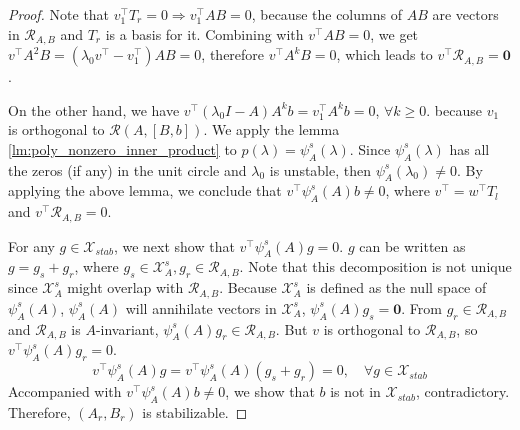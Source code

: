 \begin{proof}
Note that \(v_1^\top T_r = 0 \Rightarrow v_1^\top A B =0\), because the columns of $AB$ are vectors in \({\mathcal R}_{A,B}\) and $T_r$ is a basis for it. Combining with \(v^\top AB =0 \), we get \(v^\top A^2 B = (\lambda_0 v^\top-v_1^\top)AB=0\), therefore \(v^\top A^k B = 0\), which leads to \(v^\top \mathcal{R}_{A,B} = \mathbf{0}\).
 
On the other hand, we have \(v^\top (\lambda_0 I -A) A^{k} b =v_1^\top A^kb =0\), \(\forall k \geq 0\). because $v_1$ is orthogonal to ${\mathcal R}(A,[B,b])$.
We apply the lemma \ref{lm:poly_nonzero_inner_product} to $p
(\lambda)=\psi_A^s(\lambda)$.
Since \(\psi_A^s(\lambda)\) has all the zeros (if any) in the unit circle and \(\lambda_0\) is unstable, then \(\psi_A^s(\lambda_0) \neq 0\). By applying the above lemma, we conclude that \(v^\top \psi_A^s(A) b \neq 0\),  where $v^\top=w^\top T_l$ and $v^\top {\mathcal R}_{A,B}=0$.

For any \(g \in \mathcal{X}_{stab}\), we next show that \(v^\top \psi_A^s(A) g = 0\). \(g\) can be written as \(g = g_s + g_r\), where \(g_s \in \mathcal{X}_A^s, g_r \in \mathcal{R}_{A,B}\). Note that this decomposition is not unique since \(\mathcal{X}_A^s\) might overlap with \(\mathcal{R}_{A,B}\). Because \(\mathcal{X}_A^s\) is defined as the null space of \(\psi_A^s(A)\), \(\psi_A^s(A)\) will annihilate vectors in \(\mathcal{X}_A^s\), \(\psi_A^s(A) g_s =\mathbf{0}\).
From \(g_r \in \mathcal{R}_{A,B}\) and \(\mathcal{R}_{A,B}\) is \(A\)-invariant, \(\psi_A^s(A) g_r \in \mathcal{R}_{A,B}\). But \(v\) is orthogonal to \(\mathcal{R}_{A,B}\), so \(v^\top\psi_A^s(A) g_r = 0\).
\[
v^\top \psi_A^s(A) g = v^\top\psi_A^s(A) (g_s + g_r) =0, \quad \forall g\in  \mathcal{X}_{stab}
\]
Accompanied with \(v^\top \psi_A^s(A) b \neq 0\), we show that \(b\) is not in \(\mathcal{X}_{stab}\), contradictory. Therefore, \((A_r,B_r)\) is stabilizable.


 



\end{proof}
